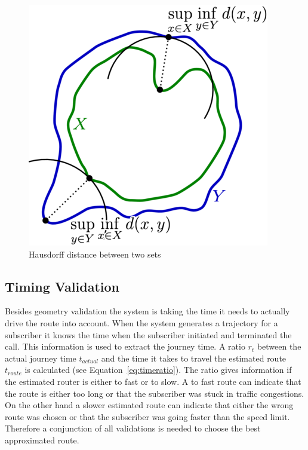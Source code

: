 \documentclass[master,english]{hgbthesis}
\begin{document}
\begin{figure}

	\centering

	\includegraphics[width=0.7\linewidth]{./images/Hausdorff_distance_sample.png}

	\caption{Hausdorff distance between two sets}

	\label{fig:Hausdorff_distance_sample}

\end{figure}

\subsection{Timing Validation}

Besides geometry validation the system is taking the time it needs to actually drive the route into account. When the system generates a trajectory for a subscriber it knows the time when the subscriber initiated and terminated the call. This information is used to extract the journey time. A ratio $r_t$ between the actual journey time $t_{actual}$ and the time it takes to travel the estimated route $t_{route}$ is calculated (see Equation~\ref{eq:timeratio}). The ratio gives information if the estimated router is either to fast or to slow. A to fast route can indicate that the route is either too long or that the subscriber was stuck in traffic congestions. On the other hand a slower estimated route can indicate that either the wrong route was chosen or that the subscriber was going faster than the speed limit. Therefore a conjunction of all validations is needed to choose the best approximated route.
\end{document}
